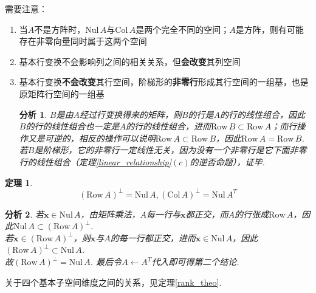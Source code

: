 \documentclass[11pt,UTF8]{ctexart}
\newtheorem{theorem}{定理}
\newtheorem*{analysis}{分析}
\def\vx{\mathbf{x}}
\def\col{\mathrm{Col}\,}
\def\nul{\mathrm{Nul}\,}
\def\row{\mathrm{Row}\,}
\begin{document}
需要注意：
\begin{enumerate}
	\itemsep -3pt
	\item 当$A$不是方阵时，$\mathrm{Nul}\, A$与$\mathrm{Col}\, A$是两个完全不同的空间；$A$是方阵，则有可能存在非零向量同时属于这两个空间
	\item 基本行变换不会影响列之间的相关关系，但\textbf{会改变}其列空间
	\item 基本行变换\textbf{不会改变}其行空间，阶梯形的\textbf{非零行}形成其行空间的一组基，也是原矩阵行空间的一组基
\begin{analysis}
$B$是由$A$经过行变换得来的矩阵，则$B$的行是$A$的行的线性组合，因此$B$的行的线性组合也一定是$A$的行的线性组合，进而$\row B\subset\row A$；而行操作又是可逆的，相反的操作可以说明$\row A\subset\row B$，因此$\row A=\row B$.\\
若$B$是阶梯形，它的非零行一定线性无关，因为没有一个非零行是它下面非零行的线性组合（定理\ref{linear_relationship}$(c)$的逆否命题），证毕.
\end{analysis}
\end{enumerate}
\begin{theorem}
\[(\row A)^{\perp}=\nul A,(\col A)^{\perp}=\nul A^T\]
\end{theorem}
\begin{analysis}
若$\vx\in\nul A$，由矩阵乘法，$A$每一行与$\vx$都正交，而$A$的行张成$\row A$，因此$\nul A\subset(\row A)^{\perp}$.\\
若$\vx\in(\row A)^\perp$，则$\vx$与$A$的每一行都正交，进而$\vx\in\nul A$，因此$(\row A)^{\perp}\subset\nul A$.\\
故$(\row A)^{\perp}=\nul A$. 最后令$A\gets A^T$代入即可得第二个结论.
\end{analysis}
\par 关于四个基本子空间维度之间的关系，见定理\ref{rank_theo}.
\end{document}
